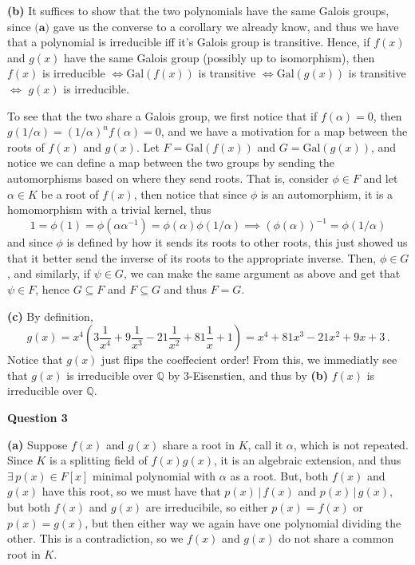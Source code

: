 \documentclass[10pt]{article}
\newcommand{\Q}{\mathbb{Q}}
\newcommand{\Gal}{\text{Gal}}
\begin{document}
\textbf{(b)} It suffices to show that the two polynomials have the same Galois groups, since $\textbf{(a)}$ gave us the converse to a corollary we already know, and thus we have that a polynomial is irreducible iff it's Galois group is transitive. Hence, if $f(x)$ and $g(x)$ have the same Galois group (possibly up to isomorphism), then $f(x)$ is irreducible $\iff \Gal(f(x))$ is transitive $\iff \Gal(g(x))$ is transitive $\iff$ $g(x)$ is irreducible.

To see that the two share a Galois group, we first notice that if $f(\alpha) = 0$, then $g(1/\alpha) = (1/\alpha)^{n}f(\alpha) = 0$, and we have a motivation for a map between the roots of $f(x)$ and $g(x)$. Let $F = \Gal(f(x))$ and $G = \Gal(g(x))$, and notice we can define a map between the two groups by sending the automorphisms based on where they send roots. That is, consider $\phi \in F$ and let $\alpha \in K$ be a root of $f(x)$, then notice that since $\phi$ is an automorphism, it is a homomorphism with a trivial kernel, thus
\[ 1 = \phi(1) = \phi(\alpha \alpha^{-1}) = \phi(\alpha)\phi(1/\alpha) \implies \left(\phi(\alpha)\right)^{-1} = \phi(1/\alpha) \]
and since $\phi$ is defined by how it sends its roots to other roots, this just showed us that it better send the inverse of its roots to the appropriate inverse. Then, $\phi \in G$, and similarly, if $\psi \in G$, we can make the same argument as above and get that $\psi \in F$, hence $G\subseteq F$ and $F\subseteq G$ and thus $F = G$.

\textbf{(c)} By definition,
\[ g(x) = x^{4}\left(3\frac{1}{x^{4}} + 9\frac{1}{x^{3}} - 21\frac{1}{x^{2}} + 81\frac{1}{x} + 1\right) = x^{4} + 81x^{3} - 21x^{2} + 9x + 3 \, .\]
Notice that $g(x)$ just flips the coeffecient order! From this, we immediatly see that $g(x)$ is irreducible over $\Q$ by 3-Eisenstien, and thus by \textbf{(b)} $f(x)$ is irreducible over $\Q$. 

\newpage
\textbf{Question 3}

\textbf{(a)} Suppose $f(x)$ and $g(x)$ share a root in $K$, call it $\alpha$, which is not repeated. Since $K$ is a splitting field of $f(x)g(x)$, it is an algebraic extension, and thus $\exists\, p(x) \in F[x]$ minimal polynomial with $\alpha$ as a root. But, both $f(x)$ and $g(x)$ have this root, so we must have that $p(x)\, | \, f(x)$ and $p(x) \, |\, g(x)$, but both $f(x)$ and $g(x)$ are irreducibile, so either $p(x) = f(x)$ or $p(x) = g(x)$, but then either way we again have one polynomial dividing the other. This is a contradiction, so we $f(x)$ and $g(x)$ do not share a common root in $K$.
\end{document}

